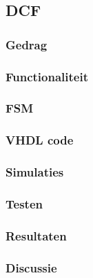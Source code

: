 \subsection{DCF}

\subsubsection{Gedrag}

\subsubsection{Functionaliteit}

\subsubsection{FSM}

\subsubsection{VHDL code}

\subsubsection{Simulaties}

\subsubsection{Testen}

\subsubsection{Resultaten}

\subsubsection{Discussie}
